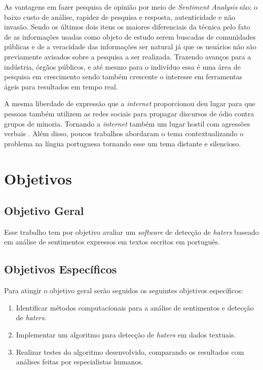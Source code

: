 As vantagens em fazer pesquisa de opinião por meio de \textit{Sentiment Analysis} são: o baixo custo de análise, rapidez de pesquisa e resposta, autenticidade e não invasão. Sendo os últimos dois itens os maiores diferenciais da técnica pelo fato de as informações usadas como objeto de estudo serem buscadas de comunidades públicas e de a veracidade das informações ser natural já que os usuários não são previamente avisados sobre a pesquisa a ser realizada. Trazendo avanços para a indústria, órgãos públicos, e até mesmo para o indivíduo essa é uma área de pesquisa em crescimento sendo também crescente o interesse em ferramentas ágeis para resultados em tempo real. 

A mesma liberdade de expressão que a \textit{internet} proporcionou deu lugar para que pessoas também utilizem as redes sociais para propagar discursos de ódio contra grupos de minoria. Tornando a \textit{internet} também um lugar hostil com agressões verbais \cite{Chetty2018}.  Além disso, poucos trabalhos abordaram o tema contextualizando o problema na língua portuguesa tornando esse um tema distante e silencioso.

\section{Objetivos}
\subsection{Objetivo Geral}    
    Esse trabalho tem por objetivo avaliar um \textit{software} de detecção de \textit{haters} baseado em análise de sentimentos expressos em textos escritos em português. 

\subsection{Objetivos Específicos}
    Para atingir o objetivo geral serão seguidos os seguintes objetivos específicos:
\begin{enumerate}
    \item Identificar métodos computacionais para a análise de sentimentos e detecção de \textit{haters}.
    \item Implementar um algoritmo para detecção de \textit{haters} em dados textuais.
    \item Realizar testes do algoritmo desenvolvido, comparando os resultados com análises feitas por especialistas humanos.
\end{enumerate}
	
